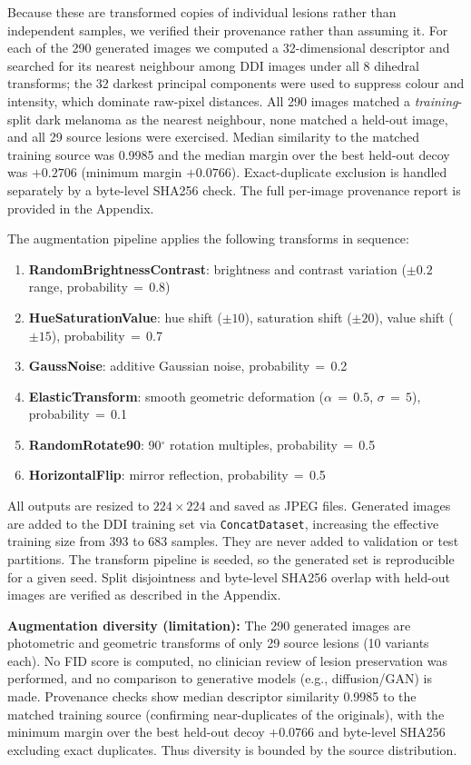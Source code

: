 Because these are transformed copies of individual lesions rather than independent samples, we verified their provenance rather than assuming it. For each of the 290 generated images we computed a 32-dimensional descriptor and searched for its nearest neighbour among DDI images under all 8 dihedral transforms; the 32 darkest principal components were used to suppress colour and intensity, which dominate raw-pixel distances. All 290 images matched a \emph{training}-split dark melanoma as the nearest neighbour, none matched a held-out image, and all 29 source lesions were exercised. Median similarity to the matched training source was 0.9985 and the median margin over the best held-out decoy was $+0.2706$ (minimum margin $+0.0766$). Exact-duplicate exclusion is handled separately by a byte-level SHA256 check. The full per-image provenance report is provided in the Appendix.

The augmentation pipeline applies the following transforms in sequence:
\begin{enumerate}
    \item \textbf{RandomBrightnessContrast}: brightness and contrast variation ($\pm 0.2$ range, probability\,$=$\,0.8)
    \item \textbf{HueSaturationValue}: hue shift ($\pm 10$), saturation shift ($\pm 20$), value shift ($\pm 15$), probability\,$=$\,0.7
    \item \textbf{GaussNoise}: additive Gaussian noise, probability\,$=$\,0.2
    \item \textbf{ElasticTransform}: smooth geometric deformation ($\alpha\,{=}\,0.5$, $\sigma\,{=}\,5$), probability\,$=$\,0.1
    \item \textbf{RandomRotate90}: 90$^\circ$ rotation multiples, probability\,$=$\,0.5
    \item \textbf{HorizontalFlip}: mirror reflection, probability\,$=$\,0.5
\end{enumerate}

All outputs are resized to $224 \times 224$ and saved as JPEG files. Generated images are added to the DDI training set via \texttt{ConcatDataset}, increasing the effective training size from 393 to 683 samples. They are never added to validation or test partitions. The transform pipeline is seeded, so the generated set is reproducible for a given seed. Split disjointness and byte-level SHA256 overlap with held-out images are verified as described in the Appendix.

\textbf{Augmentation diversity (limitation):} The 290 generated images are photometric and geometric transforms of only 29 source lesions (10 variants each). No FID score is computed, no clinician review of lesion preservation was performed, and no comparison to generative models (e.g., diffusion/GAN) is made. Provenance checks show median descriptor similarity 0.9985 to the matched training source (confirming near-duplicates of the originals), with the minimum margin over the best held-out decoy $+0.0766$ and byte-level SHA256 excluding exact duplicates. Thus diversity is bounded by the source distribution.

